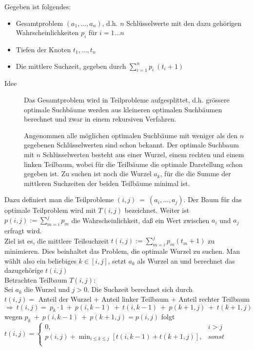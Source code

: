 Gegeben ist folgendes:
\begin{itemize}
    \item Gesamtproblem $(a_1, \dots,a_n)$, d.h. $n$ Schlüsselwerte mit den dazu gehörigen Wahrscheinlichkeiten $p_i$ für $i=1 \dots n$
    \item Tiefen der Knoten $t_1,\dots,t_n$
    \item Die mittlere Suchzeit, gegeben durch $\sum_{i=1}^n p_i\:(t_i+1)$
\end{itemize}
\begin{description}
    \item[Idee] Das Gesamtproblem wird in Teilprobleme aufgesplittet, d.h. grössere optimale Suchbäume werden
     aus kleineren optimalen Suchbäumen  berechnet und zwar in einem rekursiven Verfahren.
     
     Angenommen alle möglichen optimalen Suchbäume mit weniger als den $n$ gegebenen Schlüsselwerten sind schon bekannt.
     Der optimale Suchbaum mit $n$ Schlüsselwerten besteht aus einer Wurzel, einem rechten und einem linken Teilbaum, wobei
     für die Teilbäume die optimale Darstellung schon gegeben ist. Zu suchen ist noch die Wurzel $a_k$, für die die
     Summe der mittleren Suchzeiten der beiden Teilbäume minimal ist.
\end{description}
Dazu definiert man die Teilprobleme $(i,j)\:=\:(a_i,\dots,a_j)$. Der Baum für das optimale Teilproblem wird mit $T(i,j)$
bezeichnet. Weiter ist $p(i,j):=\sum_{m=i}^j p_m$ die Wahrscheinlichkeit, daß ein Wert zwischen $a_i$ und $a_j$
erfragt wird.\\ Ziel ist es, die mittlere Teilsuchzeit $t(i,j):=\sum_{m=i}^j p_m(t_m+1)$ zu minimieren. Dies beinhaltet
das Problem, die optimale Wurzel zu suchen. Man wählt also ein beliebiges $k\in [i,j]$, setzt $a_k$ als Wurzel
an und berechnet das dazugehörige $t(i,j)$ \\
Betrachten Teilbaum $T(i,j)$:\\ Sei $a_k$ die Wurzel und $j>0$. Die Suchzeit berechnet sich durch\\
$t(i,j)=$ Anteil der Wurzel + Anteil linker Teilbaum + Anteil rechter Teilbaum
$\Rightarrow\:t(i,j)=\:p_k\cdot 1\:+\:p(i,k-1)\:+\:t(i,k-1)\:+\:p(k+1,j)\:+\:t(k+1,j)$
wegen $p_k\:+\:p(i,k-1)\:+\:p(k+1,j)=p(i,j)$ folgt
$t(i,j)=\left\{\begin{array}{ll}
    0, & i>j \\
    p(i,j)+ \min_{i\leq k\leq j}[t(i,k-1)+t(k+1,j)], & sonst \\ \end{array}\right.    $

